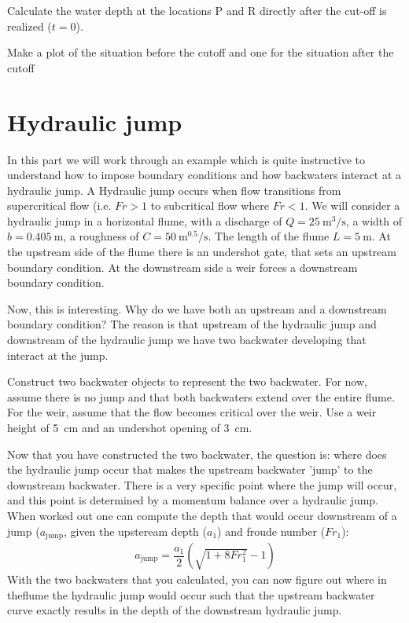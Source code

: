 \documentclass[a4paper]{article}
\begin{document}
  \begin{exercise}
    Calculate the water depth at the locations P and R directly after the cut-off is realized ($t = 0$).
  \end{exercise}

  \begin{exercise}
    Make a plot of the situation before the cutoff and one for the situation after the cutoff
  \end{exercise}


\section{Hydraulic jump}
In this part we will work through an example which is quite instructive to understand how to impose boundary conditions and how backwaters interact at a hydraulic jump. A Hydraulic jump occurs when flow transitions from supercritical flow (i.e. $Fr>1$ to subcritical flow where $Fr<1$. 
We will consider a hydraulic jump in a horizontal flume, with a discharge of $Q=\SI{25}{\cubic\m\per\s}$, a width of $b=\SI{0.405}{\m}$, a roughness of $C=\SI{50}{\m\tothe{0.5}\per\s}$. The length of the flume $L=\SI{5}{\m}$. At the upstream side of the flume there is an undershot gate, that sets an upstream boundary condition. At the downstream side a weir forces a downstream boundary condition.

Now, this is interesting. Why do we have both an upstream and a downstream boundary condition? The reason is that upstream of the hydraulic jump and downstream of the hydraulic jump we have two backwater developing that interact at the jump. 

\begin{exercise}
  Construct two backwater objects to represent the two backwater. For now, assume there is no jump and that both backwaters extend over the entire flume. For the weir, assume that the flow becomes critical over the weir. Use a weir height of \SI{5}{\cm} and an undershot opening of \SI{3}{\cm}.
\end{exercise}

Now that you have constructed the two backwater, the question is: where does the hydraulic jump occur that makes the upstream backwater 'jump' to the downstream backwater. There is a very specific point where the jump will occur, and this point is determined by a momentum balance over a hydraulic jump. When worked out one can compute the depth  that would occur downstream of a jump ($a_\text{jump}$, given the upsteream depth ($a_1$) and froude number ($Fr_1$):
\begin{align*}
  a_\text{jump}=\dfrac{a_1}{2}(\sqrt{1+8Fr_1^2}-1)
\end{align*}
With the two backwaters that you calculated, you can now figure out where in theflume the hydraulic jump would occur such that the upstream backwater curve exactly results in the depth of the downstream hydraulic jump.
\end{document}
